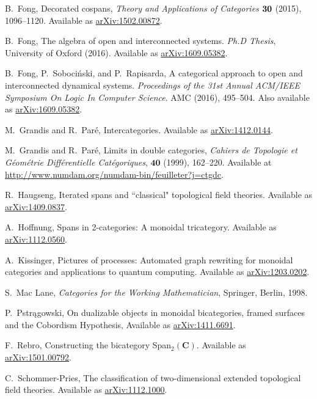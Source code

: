 \documentclass[11pt]{amsart}
\newcommand{\cat}[1]{\mathbf{#1}}
\theoremstyle{remark}
\theoremstyle{definition}
\begin{document}
\begin{thebibliography}{100}
 B.\ Fong, Decorated cospans, \textsl{Theory and Applications of Categories} $\bold{30}$ (2015), 1096--1120. Available as \href{http://arxiv.org/abs/1502.00872}{arXiv:1502.00872}.

B.~Fong,
The algebra of open and interconnected systems.
\emph{Ph.D Thesis},
University of Oxford (2016).
Available as \href{https://arxiv.org/abs/1609.05382}{arXiv:1609.05382}.

B.~Fong, P.~Soboci\'{n}ski, and P.~Rapisarda,
A categorical approach to open and interconnected dynamical systems.
\emph{Proceedings of the 31st Annual ACM/IEEE Symposium On Logic In Computer Science}.
AMC (2016), 495--504.
Also available as \href{https://arxiv.org/abs/1609.05382}{arXiv:1609.05382}.

M.~Grandis and R.~Par\'{e}, 
Intercategories.
Available as \href{https://arxiv.org/abs/1412.0144}{arXiv:1412.0144}.

M.~Grandis and R.~Par\'{e}, 
Limits in double categories, 
\emph{Cahiers de Topologie et G\'{e}om\'{e}trie Diff\'{e}rentielle Cat\'{e}goriques}, $\mathbf{40}$  
(1999), 162--220. 
Available at \href{http://www.numdam.org/numdam-bin/feuilleter?j=ctgdc}{http://www.numdam.org/numdam-bin/feuilleter?j=ctgdc}.

R.~Haugseng,
Iterated spans and ``classical"
topological field theories.
Available as \href{https://arxiv.org/abs/1409.0837}{arXiv:1409.0837}.

A.~Hoffnung,
Spans in 2-categories: A monoidal tricategory.
Available as \href{https://arxiv.org/abs/1112.0560}{arXiv:1112.0560}.

A.~Kissinger,
Pictures of processes: Automated 
graph rewriting for monoidal categories 
and applications to quantum computing.
Available as \href{https://arxiv.org/abs/1203.0202}{arXiv:1203.0202}.

S.~Mac Lane, 
\emph{Categories for the Working Mathematician},
Springer, Berlin, 1998.

P.~Pstrągowski,
On dualizable objects in monoidal bicategories, framed surfaces and the Cobordism Hypothesis, 
Available as \href{https://arxiv.org/abs/1411.6691}{arXiv:1411.6691}.

F.~Rebro, 
Constructing the bicategory Span$_{2}(\cat{C})$. 
Available as \href{https://arxiv.org/abs/1501.00792}{arXiv:1501.00792}.

C.~Schommer-Pries,
The classification of two-dimensional extended topological field theories. 
Available as \href{https://arxiv.org/abs/1112.1000}{arXiv:1112.1000}.


\end{thebibliography}
\end{document}
